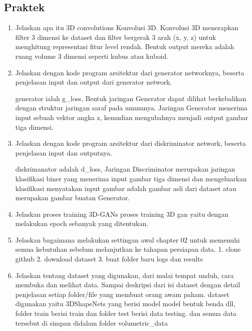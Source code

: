 \subsection{Praktek}
        \begin{enumerate}
        \item Jelaskan apa itu 3D convolutions
        Konvolusi 3D. Konvolusi 3D menerapkan filter 3 dimensi ke dataset dan filter bergerak 3 arah (x, y, z) untuk menghitung representasi fitur level rendah. Bentuk output mereka adalah ruang volume 3 dimensi seperti kubus atau kuboid.
        
        \item Jelaskan dengan kode program arsitektur dari generator networknya, beserta penjelasan input dan output dari generator network.
        
        generator ialah g\_loss, Bentuk jaringan Generator dapat dilihat berkebalikan dengan struktur jaringan saraf pada umumnya. Jaringan Generator menerima input sebuah vektor angka z, kemudian mengubahnya menjadi output gambar tiga dimensi.
        
        \item Jelaskan dengan kode program arsitektur dari diskriminator network, beserta penjelasan input dan outputnya.
        
        diskrimanator adalah d\_loss, Jaringan Discriminator merupakan jaringan klasifikasi biner yang menerima input gambar tiga dimensi dan mengeluarkan klasifikasi menyatakan input gambar adalah gambar asli dari dataset atau merupakan gambar buatan Generator.
        
        \item Jelaskan proses training 3D-GANs
        proses training 3D gan yaitu dengan melakukan epoch sebanyak yang ditentukan.
        
        \item Jelaskan bagaimana melakukan settingan awal chapter 02 untuk memenuhi semua kebutuhan sebelum melanjutkan ke tahapan persiapan data.
        1. clone github										 2. download dataset 									3. buat folder baru logs dan results
        
        \item Jelaskan tentang dataset yang digunakan, dari mulai tempat unduh, cara membuka dan melihat data. Sampai deskripsi dari isi dataset dengan detail penjelasan setiap folder/file yang membuat orang awam paham.
        dataset digunakan yaitu 3DShapeNets yang berisi model model bentuk benda dll, folder train berisi train dan folder test berisi data testing. dan semua data tersebut di simpan didalam folder volumetric\_data 
        

\end{enumerate}
